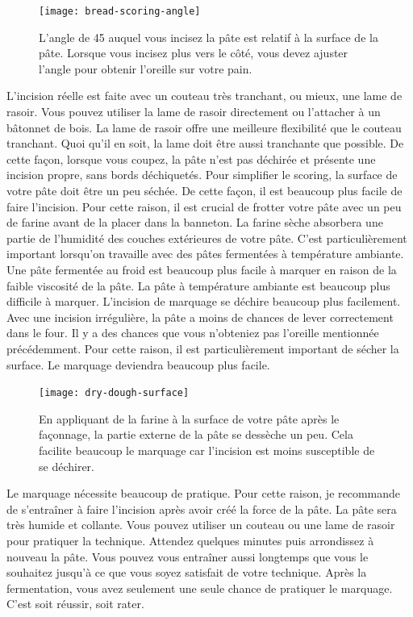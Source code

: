 \begin{figure}[htb!]
  \texttt{[image: bread-scoring-angle]}
  \caption[Angle de marquage]{L'angle de \qty{45}{\angle} auquel vous incisez la
      pâte est relatif à la surface de la pâte.  Lorsque vous incisez plus vers
      le côté, vous devez ajuster l'angle pour obtenir l'oreille sur votre
      pain.}%
  \label{fig:scoring-angle}
\end{figure}

L'incision réelle est faite avec un couteau très tranchant, ou mieux, une lame de rasoir.
Vous pouvez utiliser la lame de rasoir directement ou l'attacher à un bâtonnet de bois.
La lame de rasoir offre une meilleure flexibilité que le couteau tranchant.
Quoi qu'il en soit, la lame doit être aussi tranchante que possible. De cette façon, lorsque vous coupez,
la pâte n'est pas déchirée et présente une incision propre, sans bords déchiquetés.
Pour simplifier le scoring, la surface de votre pâte doit être un peu séchée.
De cette façon, il est beaucoup plus facile de faire l'incision.
Pour cette raison, il est crucial de frotter votre pâte avec un peu de farine
avant de la placer dans la banneton. La farine sèche absorbera une partie de l'humidité des couches extérieures de votre pâte. C'est particulièrement important
lorsqu'on travaille avec des pâtes fermentées à température ambiante. Une pâte fermentée au froid est beaucoup plus facile à marquer en raison de la faible viscosité de la pâte. La pâte à température ambiante est beaucoup plus difficile à marquer. L'incision de marquage se déchire beaucoup plus facilement. Avec une incision irrégulière, la pâte a moins de chances de lever correctement dans le four. Il y a des chances que vous n'obteniez pas l'oreille mentionnée précédemment. Pour cette raison, il est particulièrement important de sécher la surface. Le marquage deviendra beaucoup plus facile.

\begin{figure}[htb!]
  \texttt{[image: dry-dough-surface]}
  \caption[Séchage de la surface de la pâte]{En appliquant de la farine à la surface de votre pâte après le façonnage, la partie externe de la pâte se dessèche un peu. Cela facilite beaucoup le marquage car l'incision est moins susceptible de se déchirer.}%
  \label{fig:dried-out-dough-scoring}
\end{figure}


Le marquage nécessite beaucoup de pratique. Pour cette raison, je recommande
de s'entraîner à faire l'incision après avoir créé la force de la pâte. La pâte
sera très humide et collante. Vous pouvez utiliser un couteau ou une lame de rasoir
pour pratiquer la technique. Attendez quelques minutes puis arrondissez à nouveau
la pâte. Vous pouvez vous entraîner aussi longtemps que vous le souhaitez
jusqu'à ce que vous soyez satisfait de votre technique. Après la fermentation, vous avez seulement une seule chance de pratiquer le marquage. C'est soit réussir, soit rater.

